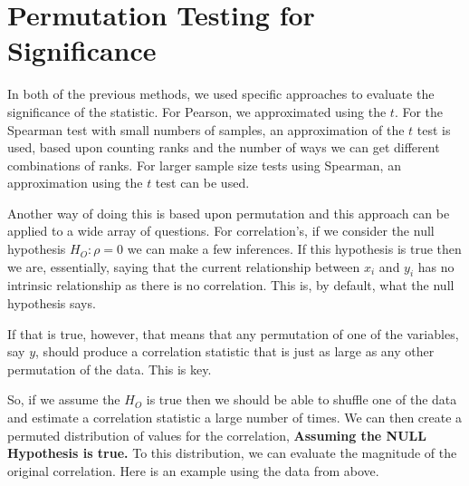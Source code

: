 \documentclass[
  letterpaper,
]{book}
\newenvironment{Shaded}{\begin{snugshade}}{\end{snugshade}}
\newcommand{\AttributeTok}[1]{\textcolor[rgb]{0.40,0.45,0.13}{#1}}
\newcommand{\ConstantTok}[1]{\textcolor[rgb]{0.56,0.35,0.01}{#1}}
\newcommand{\DecValTok}[1]{\textcolor[rgb]{0.68,0.00,0.00}{#1}}
\newcommand{\FunctionTok}[1]{\textcolor[rgb]{0.28,0.35,0.67}{#1}}
\newcommand{\NormalTok}[1]{\textcolor[rgb]{0.00,0.23,0.31}{#1}}
\newcommand{\OtherTok}[1]{\textcolor[rgb]{0.00,0.23,0.31}{#1}}
\newcommand{\SpecialCharTok}[1]{\textcolor[rgb]{0.37,0.37,0.37}{#1}}
\newcommand{\StringTok}[1]{\textcolor[rgb]{0.13,0.47,0.30}{#1}}
\begin{document}
\section{Permutation Testing for
Significance}\label{permutation-testing-for-significance}

In both of the previous methods, we used specific approaches to evaluate
the significance of the statistic. For Pearson, we approximated using
the \(t\). For the Spearman test with small numbers of samples, an
approximation of the \(t\) test is used, based upon counting ranks and
the number of ways we can get different combinations of ranks. For
larger sample size tests using Spearman, an approximation using the
\(t\) test can be used.

Another way of doing this is based upon permutation and this approach
can be applied to a wide array of questions. For correlation's, if we
consider the null hypothesis \(H_O: \rho = 0\) we can make a few
inferences. If this hypothesis is true then we are, essentially, saying
that the current relationship between \(x_i\) and \(y_i\) has no
intrinsic relationship as there is no correlation. This is, by default,
what the null hypothesis says.

If that is true, however, that means that any permutation of one of the
variables, say \(y\), should produce a correlation statistic that is
just as large as any other permutation of the data. This is key.

So, if we assume the \(H_O\) is true then we should be able to shuffle
one of the data and estimate a correlation statistic a large number of
times. We can then create a permuted distribution of values for the
correlation, \textbf{Assuming the NULL Hypothesis is true.} To this
distribution, we can evaluate the magnitude of the original correlation.
Here is an example using the data from above.

\begin{Shaded}
\end{Shaded}
\end{document}
